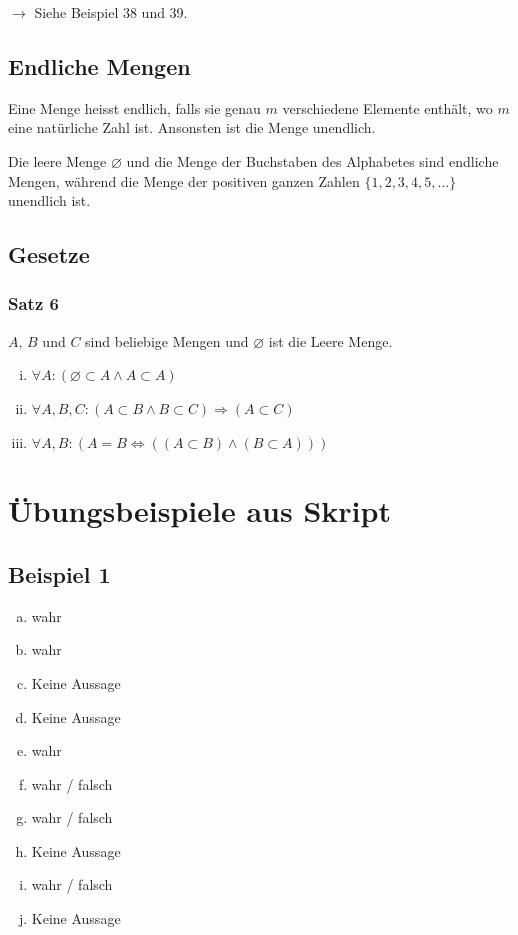 \documentclass[12pt, a4paper, oneside]{article}
\begin{document}
$\rightarrow$ Siehe Beispiel 38 und 39.

\subsection{Endliche Mengen}
Eine Menge heisst endlich, falls sie genau $m$ verschiedene Elemente enthält, wo $m$ eine natürliche Zahl ist. Ansonsten ist die Menge unendlich.

Die leere Menge $\varnothing$ und die Menge der Buchstaben des Alphabetes sind endliche Mengen, während die Menge der positiven ganzen Zahlen $\{1, 2, 3, 4, 5,\dots\}$ unendlich ist.

%
%
\newpage
\subsection{Gesetze}
\subsubsection{Satz 6}
$A$, $B$ und $C$ sind beliebige Mengen und $\varnothing$ ist die Leere Menge.
\begin{enumerate}[(i)]
  \item $\forall A : (\varnothing \subset A \land A \subset A) $
  \item $\forall A, B, C : (A \subset B \land B \subset C) \Longrightarrow (A \subset C)$
  \item $\forall A, B : (A = B \Longleftrightarrow ((A \subset B) \land (B \subset A)))$
  
\end{enumerate}

\newpage 
\section{Übungsbeispiele aus Skript}
\subsection{Beispiel 1}
\begin{enumerate}[(a)]
  \item wahr
  \item wahr
  \item Keine Aussage
  \item Keine Aussage
  \item wahr
  \item wahr / falsch
  \item wahr / falsch
  \item Keine Aussage
  \item wahr / falsch
  \item Keine Aussage
\end{enumerate}
\end{document}
